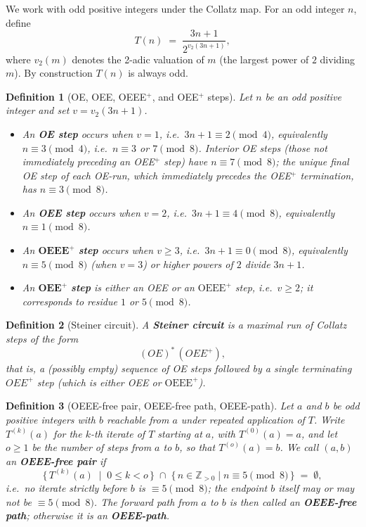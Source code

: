 \documentclass[11pt]{article}
\newtheorem{definition}{Definition}
\begin{document}
We work with odd positive integers under the Collatz map.  For an odd integer
$n$, define
\[
  T(n) \;=\; \frac{3n+1}{2^{v_2(3n+1)}},
\]
where $v_2(m)$ denotes the 2-adic valuation of $m$ (the largest power of $2$
dividing $m$).  By construction $T(n)$ is always odd.

\begin{definition}[OE, OEE, OEEE$^+$, and OEE$^+$ steps]
Let $n$ be an odd positive integer and set $v = v_2(3n+1)$.
\begin{itemize}
  \item An \textbf{OE step} occurs when $v = 1$, i.e.\ $3n+1 \equiv 2
        \pmod{4}$, equivalently $n \equiv 3 \pmod{4}$, i.e.\ $n \equiv 3$
        or $7 \pmod{8}$.  Interior OE steps (those not immediately preceding
        an OEE$^+$ step) have $n \equiv 7\pmod{8}$; the unique final OE
        step of each OE-run, which immediately precedes the OEE$^+$
        termination, has $n \equiv 3\pmod{8}$.
  \item An \textbf{OEE step} occurs when $v = 2$, i.e.\ $3n+1 \equiv 4
        \pmod{8}$, equivalently $n \equiv 1 \pmod{8}$.
  \item An $\mathbf{OEEE}^+$ \textbf{step} occurs when $v \geq 3$, i.e.\
        $3n+1 \equiv 0 \pmod{8}$, equivalently $n \equiv 5 \pmod{8}$ (when
        $v=3$) or higher powers of $2$ divide $3n+1$.
  \item An $\mathbf{OEE}^+$ \textbf{step} is either an OEE or an
        $\mathrm{OEEE}^+$ step, i.e.\ $v \geq 2$; it corresponds to
        residue $1$ or $5 \pmod 8$.
\end{itemize}
\end{definition}

\begin{definition}[Steiner circuit]
A \textbf{Steiner circuit} is a maximal run of Collatz steps of the form
\[
  (OE)^*\,(OEE^+),
\]
that is, a (possibly empty) sequence of OE steps followed by a single
terminating $OEE^+$ step (which is either OEE or $\mathrm{OEEE}^+$).
\end{definition}

\begin{definition}[OEEE-free pair, OEEE-free path, OEEE-path]
\label{def:branches}
Let $a$ and $b$ be odd positive integers with $b$ reachable from $a$
under repeated application of $T$.  Write $T^{(k)}(a)$ for the $k$-th
iterate of $T$ starting at $a$, with $T^{(0)}(a) = a$, and let $o \geq 1$
be the number of steps from $a$ to $b$, so that $T^{(o)}(a) = b$.
We call $(a, b)$ an \textbf{OEEE-free pair} if
\[
  \bigl\{\, T^{(k)}(a) \;\mid\; 0 \leq k < o \,\bigr\}
  \;\cap\; \{\,n \in \mathbb{Z}_{>0} \mid n \equiv 5\pmod{8}\,\}
  \;=\; \emptyset,
\]
i.e.\ no iterate strictly before $b$ is $\equiv 5\pmod{8}$; the endpoint
$b$ itself may or may not be $\equiv 5\pmod{8}$.  The forward path from
$a$ to $b$ is then called an \textbf{OEEE-free path}; otherwise it is an
\textbf{OEEE-path}.
\end{definition}
\end{document}
